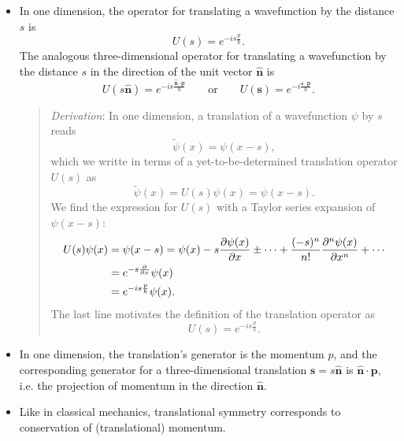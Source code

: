 \documentclass[11pt, a4paper]{article}
\newcommand{\eqtext}[1]{\qquad \text{#1} \qquad}
\renewcommand{\vec}[1]{\bm{#1}}  %
\newcommand{\uvec}[1]{\hat{\vec{#1}}}  %
\newcommand{\p}{\psi}  %
\begin{document}
\begin{itemize}
    \item In one dimension, the operator for translating a wavefunction by the distance $ s $ is
    \begin{equation*}
        U(s) = e^{-is \frac{p}{\hbar}}.
    \end{equation*}
    The analogous three-dimensional operator for translating a wavefunction by the distance $ s $ in the direction of the unit vector $ \uvec{n} $ is
    \begin{equation*}
		U(s \uvec{n}) = e^{-is \frac{\uvec{n}\cdot \vec{p}}{\hbar}} \eqtext{or} U(\vec{s}) = e^{-i \frac{\vec{s}\cdot \vec{p}}{\hbar}}.
    \end{equation*}
    \begin{quote}
        \textit{Derivation}: In one dimension, a translation of a wavefunction $ \p $ by $ s $ reads
        \begin{equation*}
            \tilde{\p}(x) = \p(x - s),
        \end{equation*}
        which we writte in terms of a yet-to-be-determined translation operator $ U(s) $ as
        \begin{equation*}
            \tilde{\psi}(x) = U(s)\p(x) = \p(x - s).
        \end{equation*}
        We find the expression for $ U(s) $ with a Taylor series expansion of $ \p(x - s) $:
        \begin{align*}
            U(s)\p(x) &= \p(x - s) = \p(x) - s \pdv{\p(x)}{x} \pm  \cdots + \frac{(-s)^{n}}{n!}\pdv[n]{\p(x)}{x} + \cdots \\
            & = e^{-s \pdv{x}}\p(x) \\
            & = e^{-is\frac{p}{\hbar}}\p(x).
        \end{align*}
        The last line motivates the definition of the translation operator as
        \begin{equation*}
            U(s) = e^{-is\frac{p}{\hbar}}.
        \end{equation*}
    \end{quote}
    
	
    \item In one dimension, the translation's generator is the momentum $ p $, and the corresponding generator for a three-dimensional translation $ \vec{s} = s \uvec{n} $ is $ \uvec{n} \cdot \vec{p} $, i.e. the projection of momentum in the direction $ \uvec{n} $.
	
	\item Like in classical mechanics, translational symmetry corresponds to conservation of (translational) momentum. 
	

\end{itemize}
\end{document}
